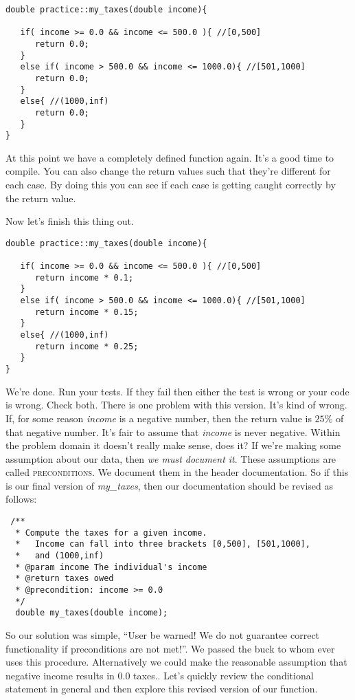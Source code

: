 \documentclass[]{tufte-handout}
\begin{document}
\begin{verbatim}
double practice::my_taxes(double income){

   if( income >= 0.0 && income <= 500.0 ){ //[0,500]
      return 0.0;
   }
   else if( income > 500.0 && income <= 1000.0){ //[501,1000]
      return 0.0;   
   }
   else{ //(1000,inf) 
      return 0.0;   
   }
}
\end{verbatim}

At this point we have a completely defined function again. It's a good time to compile. You can also change the return values such that they're different for each case. By doing this you can see if each case is getting caught correctly by the return value.

Now let's finish this thing out.
\begin{verbatim}
double practice::my_taxes(double income){

   if( income >= 0.0 && income <= 500.0 ){ //[0,500]
      return income * 0.1;
   }
   else if( income > 500.0 && income <= 1000.0){ //[501,1000]
      return income * 0.15;   
   }
   else{ //(1000,inf) 
      return income * 0.25;   
   }
}
\end{verbatim}
We're done. Run your tests. If they fail then either the test is wrong or your code is wrong. Check both. There is one problem with this version. It's kind of wrong. If, for some reason \textit{income} is a negative number, then the return value is $25\%$ of that negative number.  It's fair to assume that \textit{income} is never negative. Within the problem domain it doesn't really make sense, does it?  If we're making some assumption about our data, then \textit{we must document it}. These assumptions are called \textsc{preconditions}.  We document them in the header documentation. So if this is our final version of \textit{my\_taxes}, then our documentation should be revised as follows:
\begin{verbatim}
 /** 
  * Compute the taxes for a given income.
  *   Income can fall into three brackets [0,500], [501,1000], 
  *   and (1000,inf)
  * @param income The individual's income 
  * @return taxes owed
  * @precondition: income >= 0.0
  */
  double my_taxes(double income);
\end{verbatim}
So our solution was simple, ``User be warned! We do not guarantee correct functionality if preconditions are not met!''.  We passed the buck to whom ever uses this procedure. Alternatively we could make the reasonable assumption that negative income results in $0.0$ taxes.. Let's quickly review the conditional statement in general and then explore this revised version of our function.
\end{document}
